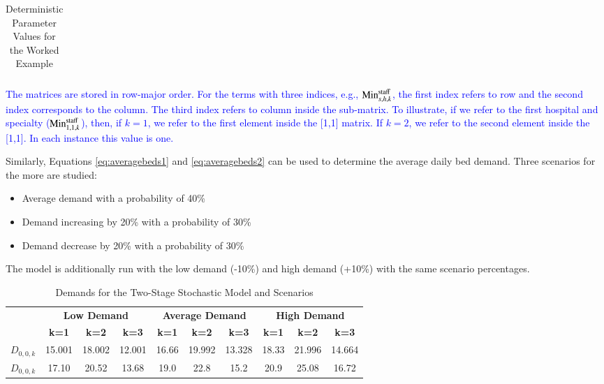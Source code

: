 \documentclass[../thesis.tex]{subfiles}
\begin{document}
{\begin{table}[h!]
\begin{tabular}{ll}
         \bottomrule
    \end{tabular}
    \caption{Deterministic Parameter Values for the Worked Example}
    \label{tab:DeterministicWorkedExample}
\end{table}

\textcolor{blue}{The matrices are stored in row-major order. For the terms with three indices, e.g., $\textnormal{Min}^{\textnormal{staff}}_{s,h,k}$, the first index refers to row and the second index corresponds to the column. The third index refers to column inside the sub-matrix. To illustrate, if we refer to the first hospital and specialty ($\textnormal{Min}^{\textnormal{staff}}_{1,1,k}$), then, if $k=1$, we refer to the first element inside the [1,1] matrix. If $k=2$, we refer to the second element inside the [1,1]. In each instance this value is one.}

Similarly, Equations \eqref{eq:averagebeds1} and \eqref{eq:averagebeds2} can be used to determine the average daily bed demand. Three scenarios for the more are studied:

\begin{itemize}
    \item Average demand with a probability of 40\%
    \item Demand increasing by 20\% with a probability of 30\% 
    \item Demand decrease by 20\% with a probability of 30\%
\end{itemize}

The model is additionally run with the low demand (-10\%) and high demand (+10\%) with the same scenario percentages.
\begin{table}[h!]
    \centering
    \begin{tabular}{cccccccccc}\toprule
    \textbf{} & \multicolumn{3}{c}{\textbf{Low Demand}}
         &  \multicolumn{3}{c}{\textbf{Average Demand}} & \multicolumn{3}{c}{\textbf{High Demand}}\\
         & \textbf{k=1} & \textbf{k=2} & \textbf{k=3}& \textbf{k=1} & \textbf{k=2} & \textbf{k=3} & \textbf{k=1} & \textbf{k=2} & \textbf{k=3} \\
         \midrule
        $D_{0,0,k}$ & 15.001 & 18.002 & 12.001 & 16.66 & 19.992 & 13.328 & 18.33 & 21.996 & 14.664 \\
        $D_{0,0,k}$ & 17.10  & 20.52  & 13.68  & 19.0  & 22.8   & 15.2   & 20.9  & 25.08  & 16.72 \\ \bottomrule
    \end{tabular}
    \caption{Demands for the Two-Stage Stochastic Model and Scenarios}
    \label{tab:WEStochDemands}
\end{table}


}
\end{document}
